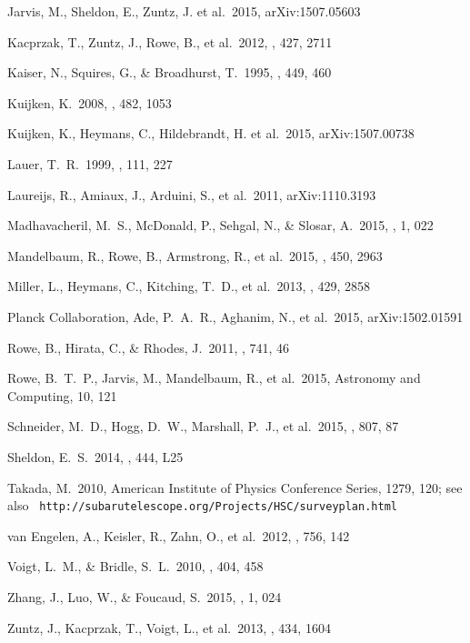 \documentclass[11pt,preprint,flushrt]{aastex}
\begin{document}
\begin{thebibliography}{}
Jarvis, M., Sheldon, E., Zuntz, J. et al.\ 2015, arXiv:1507.05603

Kacprzak, T., Zuntz, J., Rowe, B., et al.\ 2012, \mnras, 427, 2711 

Kaiser, N., Squires, G., \& Broadhurst, T.\ 1995, \apj, 449, 460 

Kuijken, K.\ 2008, \aap, 482, 1053 

Kuijken, K., Heymans, C., Hildebrandt, H. et al.\ 2015,
arXiv:1507.00738

Lauer, T.~R.\ 1999, \pasp, 111, 227

Laureijs, R., Amiaux, J., Arduini, S., et al.\ 2011, arXiv:1110.3193 

 Madhavacheril, 
M.~S., McDonald, P., Sehgal, N., \& Slosar, A.\ 2015, \jcap, 1, 022 

Mandelbaum, R., Rowe, B., Armstrong, R., et al.\ 2015, \mnras, 450, 2963 

Miller, L., Heymans, C., Kitching, T.~D., et al.\ 2013, \mnras, 429, 2858 

Planck Collaboration, Ade, P.~A.~R., Aghanim, N., et al.\ 2015, arXiv:1502.01591 

Rowe, B., Hirata, C., \& Rhodes, J.\ 2011, \apj, 741, 46

Rowe, B.~T.~P., Jarvis, M., Mandelbaum, R., et al.\ 2015, Astronomy and Computing, 10, 121 

Schneider, M.~D., Hogg, D.~W., Marshall, P.~J., et al.\ 2015, \apj, 807, 87 

Sheldon, E.~S.\ 2014, \mnras, 444, L25 

Takada, M.\ 2010, American Institute of Physics Conference Series,
1279, 120; see also {\tt
    http://subarutelescope.org/Projects/HSC/surveyplan.html}

van Engelen, A., Keisler, R., Zahn, O., et al.\ 2012, \apj, 756, 142 

Voigt, L.~M., \& Bridle, S.~L.\ 2010, \mnras, 404, 458

Zhang, J., Luo, W., \& Foucaud, S.\ 2015, \jcap, 1, 024 

Zuntz, J., Kacprzak, T., Voigt, L., et al.\ 2013, \mnras, 434, 1604

\end{thebibliography}
\end{document}
